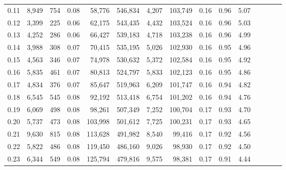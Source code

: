 \begin{tabular}{rrrcrrrrrrrrrrr}
0.11 &   8,949 &    754 &                                       0.08 &   58,776 &  546,834 &    4,207 &  103,749 &  0.16 &  0.96 &                         5.07 \\
0.12 &   3,399 &    225 &                                       0.06 &   62,175 &  543,435 &    4,432 &  103,524 &  0.16 &  0.96 &                         5.03 \\
0.13 &   4,252 &    286 &                                       0.06 &   66,427 &  539,183 &    4,718 &  103,238 &  0.16 &  0.96 &                         4.99 \\
0.14 &   3,988 &    308 &                                       0.07 &   70,415 &  535,195 &    5,026 &  102,930 &  0.16 &  0.95 &                         4.96 \\
0.15 &   4,563 &    346 &                                       0.07 &   74,978 &  530,632 &    5,372 &  102,584 &  0.16 &  0.95 &                         4.92 \\
0.16 &   5,835 &    461 &                                       0.07 &   80,813 &  524,797 &    5,833 &  102,123 &  0.16 &  0.95 &                         4.86 \\
0.17 &   4,834 &    376 &                                       0.07 &   85,647 &  519,963 &    6,209 &  101,747 &  0.16 &  0.94 &                         4.82 \\
0.18 &   6,545 &    545 &                                       0.08 &   92,192 &  513,418 &    6,754 &  101,202 &  0.16 &  0.94 &                         4.76 \\
0.19 &   6,069 &    498 &                                       0.08 &   98,261 &  507,349 &    7,252 &  100,704 &  0.17 &  0.93 &                         4.70 \\
0.20 &   5,737 &    473 &                                       0.08 &  103,998 &  501,612 &    7,725 &  100,231 &  0.17 &  0.93 &                         4.65 \\
0.21 &   9,630 &    815 &                                       0.08 &  113,628 &  491,982 &    8,540 &   99,416 &  0.17 &  0.92 &                         4.56 \\
0.22 &   5,822 &    486 &                                       0.08 &  119,450 &  486,160 &    9,026 &   98,930 &  0.17 &  0.92 &                         4.50 \\
0.23 &   6,344 &    549 &                                       0.08 &  125,794 &  479,816 &    9,575 &   98,381 &  0.17 &  0.91 &                         4.44 \\

\end{tabular}
